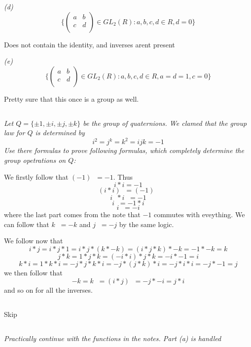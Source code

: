 \documentclass[11pt,oneside,titlepage]{book}
\DeclareMathOperator \inv {^{-1}}
\newcommand{\set}[1]{\{ #1 \}}
\begin{document}
\textit{(d)
  $$\set{
  \begin{pmatrix}
    a & b \\
    c & d \\
  \end{pmatrix} \in GL_2(R): a, b, c, d \in R, d = 0}
  $$
}

Does not contain the identity, and inverses arent present

\textit{(e)
  $$\set{
  \begin{pmatrix}
    a & b \\
    c & d \\
  \end{pmatrix} \in GL_2(R): a, b, c, d \in R, a = d = 1, c = 0}
  $$
}

Pretty sure that this once is a group as well.

\subsection{}

\textit{Let $Q = \set{\pm 1, \pm i, \pm j, \pm k}$ be the group of quaternions.
  We clamed that the group law for $Q$ is determined by
  $$i^2 = j^k = k^2 = i j k = -1$$
  Use there formulas to prove following formulas, which completely determine the group
  opetrations on $Q$:
}

We firstly follow that $(-1)\inv = -1$. Thus
$$i * i = -1$$
$$(i * i)\inv = (-1)\inv$$
$$i\inv * i\inv = -1$$
$$i\inv = -1 * i $$
$$i\inv = -i$$
where the last part comes from the note that $-1$ commutes with eveything.
We can follow that $k\inv = -k$ and $j\inv = -j$ by the same logic.

We follow now that
$$i * j = i * j * 1 = i * j * (k * -k) = (i * j * k) * -k = -1 * -k = k$$
$$j * k = 1 * j * k = (-i * i) * j * k = -i * -1 = i$$
$$k * i =  1 * k * i = -j * j * k * i = -j * (j * k) * i = -j * i * i = -j * -1 = j$$
we then follow that
$$-k = k\inv = (i * j) \inv = -j * -i = j * i$$
and so on for all the inverses.

\subsection{}

Skip

\subsection{}

\textit{Practically continue with the functions in the notes. Part (a)
is handled}
\end{document}

